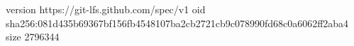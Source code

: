 version https://git-lfs.github.com/spec/v1
oid sha256:081d435b69367bf156fb4548107ba2cb2721cb9c078990fd68c0a6062ff2aba4
size 2796344
